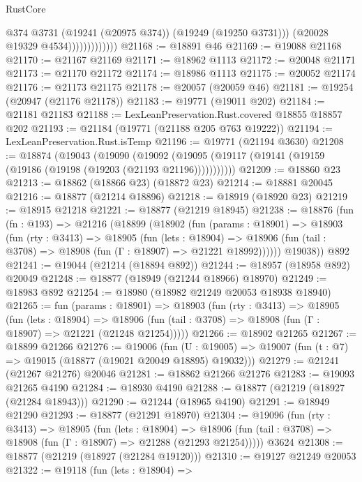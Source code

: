 \begin{lexlean}{RustCore}
\begin{coremodule}
                              @374
                              @3731
                              (@19241 (@20975 @374))
                              (@19249 (@19250 @3731)))
                            (@20028 @19329 @4534)))))))))))))
@21168 := @18891 @46
@21169 := @19088 @21168
@21170 := @21167 @21169
@21171 := @18962 @1113
@21172 := @20048 @21171
@21173 := @21170 @21172
@21174 := @18986 @1113
@21175 := @20052 @21174
@21176 := @21173 @21175
@21178 := @20057 (@20059 @46)
@21181 := @19254 (@20947 (@21176 @21178))
@21183 := @19771 (@19011 @202)
@21184 := @21181 @21183
@21188 := LexLeanPreservation.Rust.covered @18855 @18857 @202
@21193 := @21184 (@19771 (@21188 @205 @763 @19222))
@21194 := LexLeanPreservation.Rust.isTemp
@21196 := @19771 (@21194 @3630)
@21208 := @18874
    (@19043
      (@19090
        (@19092 (@19095 (@19117 (@19141 (@19159 (@19186 (@19198 (@19203 (@21193 @21196)))))))))))
@21209 := @18860 @23
@21213 := @18862 (@18866 @23) (@18872 @23)
@21214 := @18881 @20045
@21216 := @18877 (@21214 @18896)
@21218 := @18919 (@18920 @23)
@21219 := @18915 @21218
@21221 := @18877 (@21219 @18945)
@21238 := @18876
    (fun (fn : @193) =>
    @21216
      (@18899
        (@18902
          (fun (params : @18901) =>
          @18903
            (fun (rty : @3413) =>
            @18905
              (fun (lets : @18904) =>
              @18906 (fun (tail : @3708) => @18908 (fun (Γ : @18907) => @21221 @18992))))))
        @19038))
    @892
@21241 := @19044 (@21214 (@18894 @892))
@21244 := @18957 (@18958 @892) @20049
@21248 := @18877 (@18949 (@21244 @18966) @18970)
@21249 := @18983 @892
@21254 := @18980 (@18982 @21249 @20053 @18938 @18940)
@21265 := fun (params : @18901) =>
  @18903
    (fun (rty : @3413) =>
    @18905
      (fun (lets : @18904) =>
      @18906 (fun (tail : @3708) => @18908 (fun (Γ : @18907) => @21221 (@21248 @21254)))))
@21266 := @18902 @21265
@21267 := @18899 @21266
@21276 := @19006
    (fun (U : @19005) => @19007 (fun (t : @7) => @19015 (@18877 (@19021 @20049 @18895) @19032)))
@21279 := @21241 (@21267 @21276) @20046
@21281 := @18862 @21266 @21276
@21283 := @19093 @21265 @4190
@21284 := @18930 @4190
@21288 := @18877 (@21219 (@18927 (@21284 @18943)))
@21290 := @21244 (@18965 @4190)
@21291 := @18949 @21290
@21293 := @18877 (@21291 @18970)
@21304 := @19096
    (fun (rty : @3413) =>
    @18905
      (fun (lets : @18904) =>
      @18906 (fun (tail : @3708) => @18908 (fun (Γ : @18907) => @21288 (@21293 @21254)))))
    @3624
@21308 := @18877 (@21219 (@18927 (@21284 @19120)))
@21310 := @19127 @21249 @20053
@21322 := @19118
    (fun (lets : @18904) =>

\end{coremodule}
\end{lexlean}

